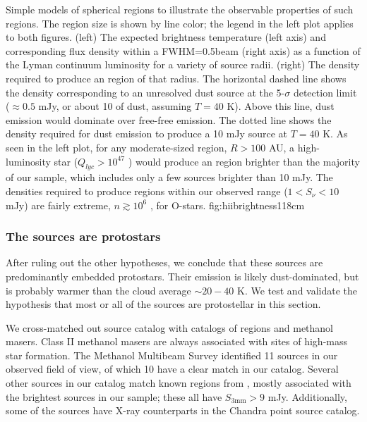 \documentclass[twocolumn]{aastex61}
\begin{document}
{Simple models of spherical \hii regions to illustrate the observable
properties of such regions.  The \hii region size is shown by line color; the legend
in the left plot applies to both figures.  (left) The expected brightness temperature (left
axis) and corresponding flux density within a FWHM=0.5\arcsec beam (right axis) as a
function of the Lyman continuum luminosity for a variety of source radii.
(right) The density required to produce an \hii region of that radius.  The
horizontal dashed line shows the density corresponding to an unresolved dust
source at the 5-$\sigma$ detection limit ($\approx0.5$ mJy, or about 10 \msun
of dust,
assuming $T=40$ K).  Above this line, dust emission would dominate over
free-free emission.  The dotted line shows the density required for dust
emission to produce a 10 mJy source at $T=40$ K.  
As seen in the left plot, for any moderate-sized \hii region, $R>100$ AU, a high-luminosity
star ($Q_{lyc} > 10^{47}$ \pers) would produce an \hii region brighter than the
majority of our sample, which includes only a few sources brighter than 10 mJy.
The densities required to produce \hii regions within our observed range
($1<S_\nu<10$ mJy) are fairly extreme, $n\gtrsim10^6$ \percc, for O-stars.}
{fig:hiibrightness}{1}{18cm}


\subsubsection{The sources are protostars}
\label{sec:theyareprotostars}
After ruling out the other hypotheses, we conclude that these sources are
predominantly embedded protostars.  Their emission is likely dust-dominated,
but is probably warmer than the cloud average $\sim20-40$ K.
We test and validate the hypothesis that most or all of the sources
are protostellar in this section.

We cross-matched out source catalog with catalogs of \hii regions and 
methanol masers.  Class II methanol masers are always associated
with sites of high-mass star formation.
The \citet{Caswell2010a} Methanol Multibeam Survey identified 11 sources in our
observed field of view, of which 10 have a clear match in our catalog.
Several other sources in our catalog match known \hii regions from
\citet{Gaume1995a}, mostly associated with the brightest sources in our sample;
these all have $S_{3 \textrm{mm}} > 9$ mJy.  Additionally, some of the
sources have X-ray counterparts in the \citet{Muno2009a} Chandra point source
catalog.
\end{document}
